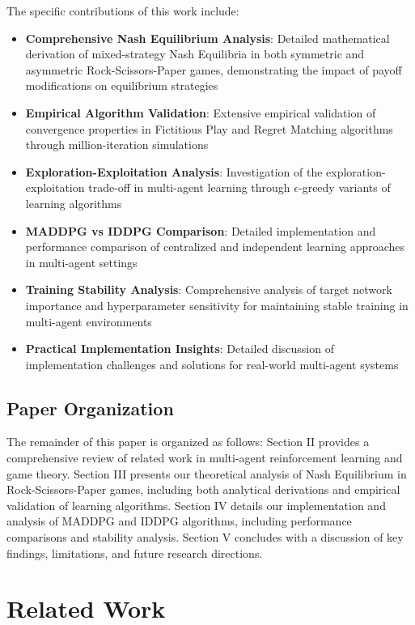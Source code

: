 \documentclass[conference]{IEEEtran}
\begin{document}
The specific contributions of this work include:
\begin{itemize}
    \item \textbf{Comprehensive Nash Equilibrium Analysis}: Detailed mathematical derivation of mixed-strategy Nash Equilibria in both symmetric and asymmetric Rock-Scissors-Paper games, demonstrating the impact of payoff modifications on equilibrium strategies
    \item \textbf{Empirical Algorithm Validation}: Extensive empirical validation of convergence properties in Fictitious Play and Regret Matching algorithms through million-iteration simulations
    \item \textbf{Exploration-Exploitation Analysis}: Investigation of the exploration-exploitation trade-off in multi-agent learning through $\epsilon$-greedy variants of learning algorithms
    \item \textbf{MADDPG vs IDDPG Comparison}: Detailed implementation and performance comparison of centralized and independent learning approaches in multi-agent settings
    \item \textbf{Training Stability Analysis}: Comprehensive analysis of target network importance and hyperparameter sensitivity for maintaining stable training in multi-agent environments
    \item \textbf{Practical Implementation Insights}: Detailed discussion of implementation challenges and solutions for real-world multi-agent systems
\end{itemize}

\subsection{Paper Organization}

The remainder of this paper is organized as follows: Section II provides a comprehensive review of related work in multi-agent reinforcement learning and game theory. Section III presents our theoretical analysis of Nash Equilibrium in Rock-Scissors-Paper games, including both analytical derivations and empirical validation of learning algorithms. Section IV details our implementation and analysis of MADDPG and IDDPG algorithms, including performance comparisons and stability analysis. Section V concludes with a discussion of key findings, limitations, and future research directions.

\section{Related Work}
\end{document}
